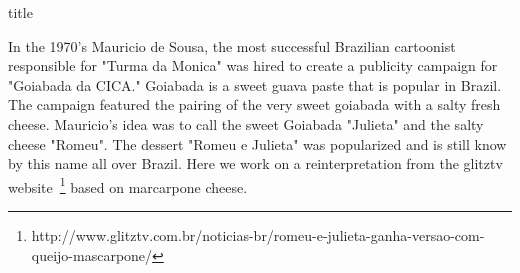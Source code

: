 \documentclass [11pt, letterpaper] {article}
\begin{document}
 {title}

In the 1970's Mauricio de Sousa, the most successful Brazilian cartoonist responsible for "Turma da Monica" was hired to create a publicity campaign for "Goiabada da CICA." Goiabada is a sweet guava paste that is popular in Brazil. The campaign featured the pairing of the very sweet goiabada with a salty fresh cheese. Mauricio's idea was to call the sweet Goiabada "Julieta" and the salty cheese "Romeu". The  dessert "Romeu e Julieta" was popularized and is still know by this name all over Brazil. Here we work on a reinterpretation from the glitztv website~\footnote{http://www.glitztv.com.br/noticias-br/romeu-e-julieta-ganha-versao-com-queijo-mascarpone/} based on marcarpone cheese.

\vspace{0.3in}
\end{document}
